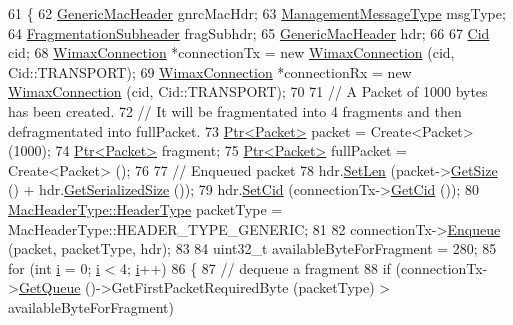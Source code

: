\begin{DoxyCode}
61 \{
62   \hyperlink{classns3_1_1GenericMacHeader}{GenericMacHeader} gnrcMacHdr;
63   \hyperlink{classns3_1_1ManagementMessageType}{ManagementMessageType} msgType;
64   \hyperlink{classns3_1_1FragmentationSubheader}{FragmentationSubheader} fragSubhdr;
65   \hyperlink{classns3_1_1GenericMacHeader}{GenericMacHeader} hdr;
66 
67   \hyperlink{classns3_1_1Cid}{Cid} cid;
68   \hyperlink{classns3_1_1WimaxConnection}{WimaxConnection} *connectionTx = \textcolor{keyword}{new} \hyperlink{classns3_1_1WimaxConnection}{WimaxConnection} (cid, Cid::TRANSPORT);
69   \hyperlink{classns3_1_1WimaxConnection}{WimaxConnection} *connectionRx = \textcolor{keyword}{new} \hyperlink{classns3_1_1WimaxConnection}{WimaxConnection} (cid, Cid::TRANSPORT);
70 
71   \textcolor{comment}{// A Packet of 1000 bytes has been created.}
72   \textcolor{comment}{// It will be fragmentated into 4 fragments and then defragmentated into fullPacket.}
73   \hyperlink{classns3_1_1Ptr}{Ptr<Packet>} packet = Create<Packet> (1000);
74   \hyperlink{classns3_1_1Ptr}{Ptr<Packet>} fragment;
75   \hyperlink{classns3_1_1Ptr}{Ptr<Packet>} fullPacket = Create<Packet> ();
76 
77   \textcolor{comment}{// Enqueued packet}
78   hdr.\hyperlink{classns3_1_1GenericMacHeader_ad0b87b780d222778c78b783f7f4e5237}{SetLen} (packet->\hyperlink{classns3_1_1Packet_a462855c9929954d4301a4edfe55f4f1c}{GetSize} () + hdr.\hyperlink{classns3_1_1GenericMacHeader_a406a3aea98a270418d62587315c50deb}{GetSerializedSize} ());
79   hdr.\hyperlink{classns3_1_1GenericMacHeader_adb74c3c234787de22682103cba562d83}{SetCid} (connectionTx->\hyperlink{classns3_1_1WimaxConnection_a22540186bbe5e147236390df0232a797}{GetCid} ());
80   \hyperlink{classns3_1_1MacHeaderType_a54d8fc8bc93a2b7865627965cdd31c20}{MacHeaderType::HeaderType} packetType = MacHeaderType::HEADER\_TYPE\_GENERIC;
81 
82   connectionTx->\hyperlink{classns3_1_1WimaxConnection_a2f7f3bf452c58c3390a096e1b354a86f}{Enqueue} (packet, packetType, hdr);
83 
84   uint32\_t availableByteForFragment = 280;
85   \textcolor{keywordflow}{for} (\textcolor{keywordtype}{int} \hyperlink{bernuolliDistribution_8m_a6f6ccfcf58b31cb6412107d9d5281426}{i} = 0; \hyperlink{bernuolliDistribution_8m_a6f6ccfcf58b31cb6412107d9d5281426}{i} < 4; \hyperlink{bernuolliDistribution_8m_a6f6ccfcf58b31cb6412107d9d5281426}{i}++)
86     \{
87       \textcolor{comment}{// dequeue a fragment}
88       \textcolor{keywordflow}{if} (connectionTx->\hyperlink{classns3_1_1WimaxConnection_a5df7525db9277d05f62e3620f9ae4058}{GetQueue} ()->GetFirstPacketRequiredByte (packetType) > 
      availableByteForFragment)

\end{DoxyCode}
